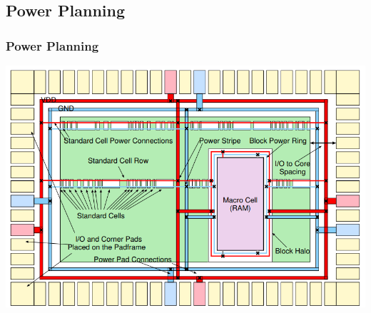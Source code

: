 \documentclass[compress]{beamer}
\begin{document}
\subsection[Power]{Power Planning}
\begin{frame}
	\frametitle{Power Planning}
	\begin{center}
		\includegraphics[width=\textwidth]{power}
	\end{center}
\end{frame}
\end{document}
